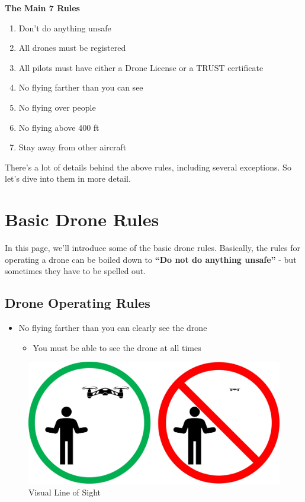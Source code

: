 \documentclass[
  12pt,
]{book}
\providecommand{\tightlist}{%
  \setlength{\itemsep}{0pt}\setlength{\parskip}{0pt}}
\begin{document}
\textbf{The Main 7 Rules}

\begin{enumerate}
\def\labelenumi{\arabic{enumi}.}
\tightlist
\item
  Don't do anything unsafe
\item
  All drones must be registered
\item
  All pilots must have either a Drone License or a TRUST certificate
\item
  No flying farther than you can see
\item
  No flying over people
\item
  No flying above 400 ft
\item
  Stay away from other aircraft
\end{enumerate}

There's a lot of details behind the above rules, including several exceptions. So let's dive into them in more detail.

\section{Basic Drone Rules}\label{basic-drone-rules}

In this page, we'll introduce some of the basic drone rules. Basically, the rules for operating a drone can be boiled down to \textbf{``Do not do anything unsafe''} - but sometimes they have to be spelled out.

\subsection{Drone Operating Rules}\label{drone-operating-rules}

\begin{itemize}
\tightlist
\item
  No flying farther than you can clearly see the drone

  \begin{itemize}
  \tightlist
  \item
    You must be able to see the drone at all times
  \end{itemize}
\end{itemize}

\begin{figure}

{\centering \includegraphics[width=0.7\linewidth]{images/VLOS_simple} 

}

\caption{Visual Line of Sight}\label{fig:VLOS}
\end{figure}
\end{document}
